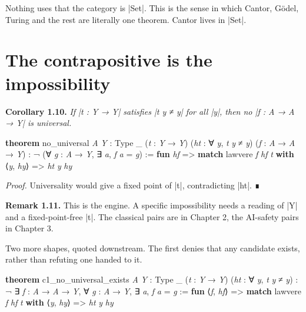 \documentclass{memoir}
\begin{document}
Nothing uses that the category is \LeanVerb|Set|. This is the sense in which Cantor,
Gödel, Turing and the rest are literally one theorem. Cantor lives in \LeanVerb|Set|.



\section{The contrapositive is the impossibility}\label{Two--Schemas--of--Impossibility-005F-005F-005F--Machine--Checked--Limits--of--Trustworthy--Machine--Learning-005F-005F-005F--and--Why--They--Tighten--with--Capability----The--Diagonal----The--contrapositive--is--the--impossibility}

\textbf{Corollary 1.10.} \emph{If \LeanVerb|t : Y → Y| satisfies \LeanVerb|t y ≠ y| for all \LeanVerb|y|, then no
\LeanVerb|f : A → A → Y| is universal.}

\begin{LeanVerbatim}
\textbf{theorem} no_universal \textit{A} \textit{Y} : Type _ (\textit{t} : \textit{Y} → \textit{Y})
    (\textit{ht} : ∀ \textit{y}, \textit{t} \textit{y} ≠ \textit{y})
    (\textit{f} : \textit{A} → \textit{A} → \textit{Y}) : ¬ (∀ \textit{g} : \textit{A} → \textit{Y}, ∃ \textit{a}, \textit{f} \textit{a} = \textit{g}) :=
  \textbf{fun} \textit{hf} => \textbf{match} lawvere \textit{f} \textit{hf} \textit{t} \textbf{with}
     ⟨\textit{y}, \textit{hy}⟩ => \textit{ht} \textit{y} \textit{hy}

\end{LeanVerbatim}


\emph{Proof.} Universality would give a fixed point of \LeanVerb|t|, contradicting \LeanVerb|ht|. ∎

\textbf{Remark 1.11.} This is the engine. A specific impossibility needs a reading of \LeanVerb|Y|
and a fixed-point-free \LeanVerb|t|. The classical pairs are in Chapter 2, the AI-safety
pairs in Chapter 3.

Two more shapes, quoted downstream. The first denies that any candidate exists,
rather than refuting one handed to it.

\begin{LeanVerbatim}
\textbf{theorem} c1_no_universal_exists \textit{A} \textit{Y} : Type _ (\textit{t} : \textit{Y} → \textit{Y})
    (\textit{ht} : ∀ \textit{y}, \textit{t} \textit{y} ≠ \textit{y}) :
    ¬ ∃ \textit{f} : \textit{A} → \textit{A} → \textit{Y}, ∀ \textit{g} : \textit{A} → \textit{Y}, ∃ \textit{a}, \textit{f} \textit{a} = \textit{g} :=
  \textbf{fun} ⟨\textit{f}, \textit{hf}⟩ => \textbf{match} lawvere \textit{f} \textit{hf} \textit{t} \textbf{with}
     ⟨\textit{y}, \textit{hy}⟩ => \textit{ht} \textit{y} \textit{hy}

\end{LeanVerbatim}
\end{document}
